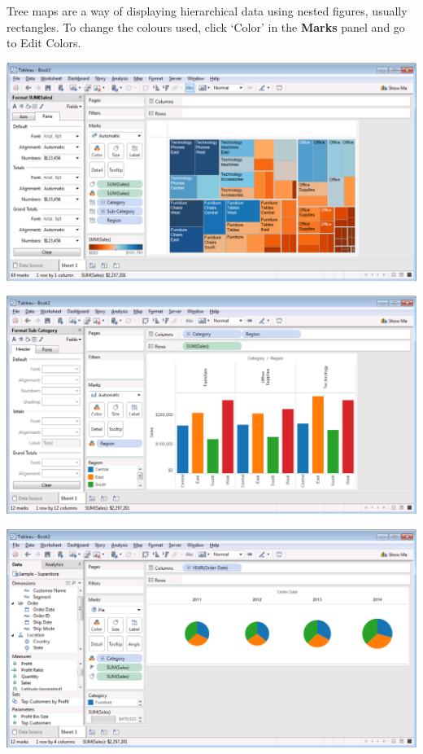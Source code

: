 \documentclass[xcolor=svgnames]{beamer} %
\begin{document}
\begin{frame}
Tree maps  are a way of displaying hierarchical data using nested figures, usually rectangles.
To change the colours used, click `Color' in the  {\bf Marks} panel and go to Edit Colors.
\begin{center}
\includegraphics[width=.9\textwidth]{img/treemap}
\end{center}
\end{frame}


\begin{frame}

\begin{center}
\includegraphics[width=.9\textwidth]{img/bar}
\end{center}
\end{frame}


\begin{frame}
\begin{center}
\includegraphics[width=.9\textwidth]{img/piecharts}
\end{center}
\end{frame}
\end{document}
